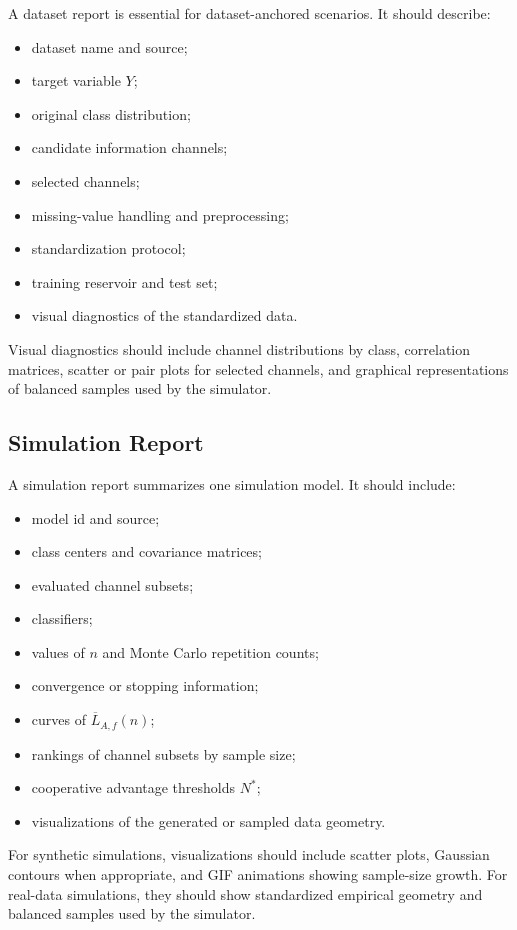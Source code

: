 \documentclass[11pt,a4paper]{article}
\begin{document}
A dataset report is essential for dataset-anchored scenarios. It should describe:
\begin{itemize}
    \item dataset name and source;
    \item target variable $Y$;
    \item original class distribution;
    \item candidate information channels;
    \item selected channels;
    \item missing-value handling and preprocessing;
    \item standardization protocol;
    \item training reservoir and test set;
    \item visual diagnostics of the standardized data.
\end{itemize}

Visual diagnostics should include channel distributions by class, correlation matrices, scatter or pair plots for selected channels, and graphical representations of balanced samples used by the simulator.

\subsection{Simulation Report}

A simulation report summarizes one simulation model. It should include:
\begin{itemize}
    \item model id and source;
    \item class centers and covariance matrices;
    \item evaluated channel subsets;
    \item classifiers;
    \item values of $n$ and Monte Carlo repetition counts;
    \item convergence or stopping information;
    \item curves of $\overline{L}_{A,f}(n)$;
    \item rankings of channel subsets by sample size;
    \item cooperative advantage thresholds $N^*$;
    \item visualizations of the generated or sampled data geometry.
\end{itemize}

For synthetic simulations, visualizations should include scatter plots, Gaussian contours when appropriate, and GIF animations showing sample-size growth. For real-data simulations, they should show standardized empirical geometry and balanced samples used by the simulator.
\end{document}
